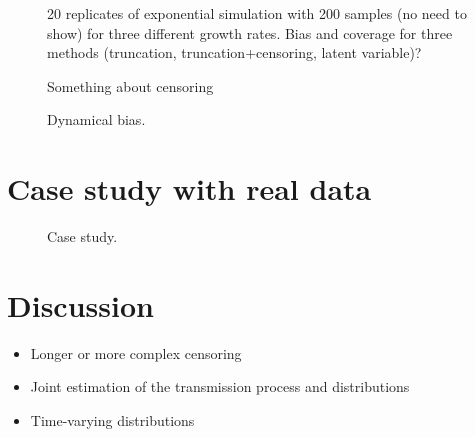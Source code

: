 \documentclass[12pt]{article}
\begin{document}
\begin{figure}
\caption{
20 replicates of exponential simulation with 200 samples (no need to show) for three different growth rates. Bias and coverage for three methods (truncation, truncation+censoring, latent variable)? 
}
\end{figure}

\begin{figure}
\caption{
Something about censoring
}
\end{figure}

\begin{figure}
\caption{
Dynamical bias.
}
\end{figure}

\section{Case study with real data}

\begin{figure}
\caption{
Case study.
}
\end{figure}

\section{Discussion}

\begin{itemize}
	\item Longer or more complex censoring
	\item Joint estimation of the transmission process and distributions
	\item Time-varying distributions
\end{itemize}	

\pagebreak


\end{document}
